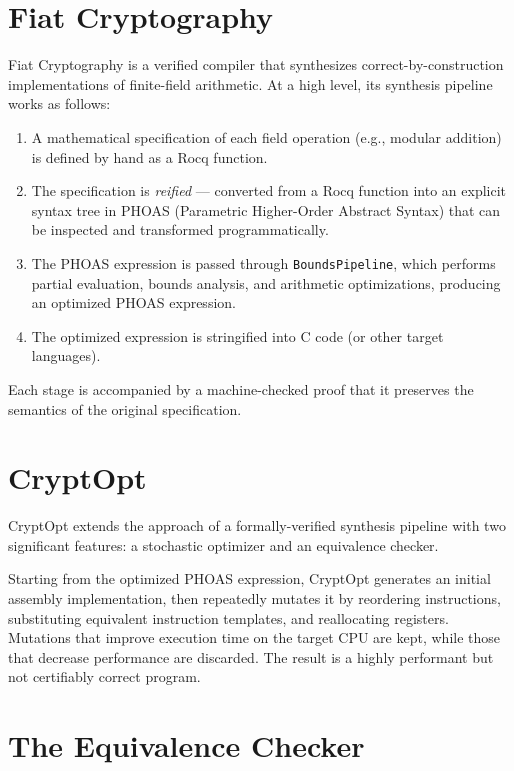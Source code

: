 \section{Fiat Cryptography}
\label{sec:fiat-crypto}
Fiat Cryptography \autocite{fiatcrypto2019} is a verified compiler that synthesizes correct-by-construction implementations of finite-field arithmetic.
At a high level, its synthesis pipeline works as follows:
\begin{enumerate}
    \item A mathematical specification of each field operation (e.g., modular addition) is defined by hand as a Rocq function.
    \item The specification is \textit{reified} --- converted from a Rocq function into an explicit syntax tree in PHOAS (Parametric Higher-Order Abstract Syntax) that can be inspected and transformed programmatically.
    \item The PHOAS expression is passed through \texttt{BoundsPipeline}, which performs partial evaluation, bounds analysis, and arithmetic optimizations, producing an optimized PHOAS expression.
    \item The optimized expression is stringified into C code (or other target languages).
\end{enumerate}
Each stage is accompanied by a machine-checked proof that it preserves the semantics of the original specification.


\section{CryptOpt}
\label{sec:cryptopt}
CryptOpt \autocite{cryptopt2023} extends the approach of a formally-verified synthesis pipeline with two significant features: a stochastic optimizer and an equivalence checker.

Starting from the optimized PHOAS expression, CryptOpt generates an initial assembly implementation, then repeatedly mutates it by reordering instructions, substituting equivalent instruction templates, and reallocating registers. Mutations that improve execution time on the target CPU are kept, while those that decrease performance are discarded. The result is a highly performant but not certifiably correct program.

\section{The Equivalence Checker}
\label{sec:equiv-checker}

